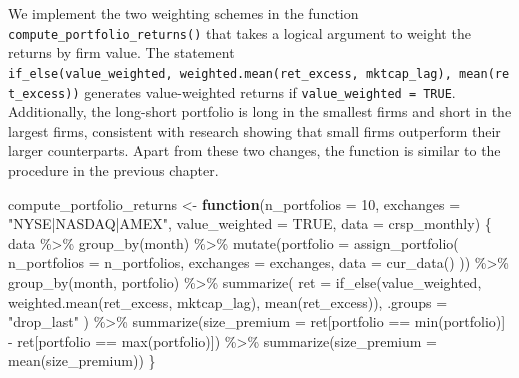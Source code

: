\documentclass[
]{krantz}
\newenvironment{Shaded}{\begin{snugshade}}{\end{snugshade}}
\newcommand{\AttributeTok}[1]{\textcolor[rgb]{0.61,0.61,0.61}{#1}}
\newcommand{\ConstantTok}[1]{\textcolor[rgb]{0,0,0}{#1}}
\newcommand{\ControlFlowTok}[1]{\textcolor[rgb]{0.27,0.27,0.27}{\textbf{#1}}}
\newcommand{\DecValTok}[1]{\textcolor[rgb]{0.06,0.06,0.06}{#1}}
\newcommand{\FunctionTok}[1]{\textcolor[rgb]{0,0,0}{#1}}
\newcommand{\NormalTok}[1]{#1}
\newcommand{\OtherTok}[1]{\textcolor[rgb]{0.37,0.37,0.37}{#1}}
\newcommand{\SpecialCharTok}[1]{\textcolor[rgb]{0,0,0}{#1}}
\newcommand{\StringTok}[1]{\textcolor[rgb]{0.5,0.5,0.5}{#1}}
\begin{document}
We implement the two weighting schemes in the function \texttt{compute\_portfolio\_returns()} that takes a logical argument to weight the returns by firm value. The statement \texttt{if\_else(value\_weighted,\ weighted.mean(ret\_excess,\ mktcap\_lag),\ mean(ret\_excess))} generates value-weighted returns if \texttt{value\_weighted\ =\ TRUE}. Additionally, the long-short portfolio is long in the smallest firms and short in the largest firms, consistent with research showing that small firms outperform their larger counterparts. Apart from these two changes, the function is similar to the procedure in the previous chapter.

\begin{Shaded}
\begin{Highlighting}[]
\NormalTok{compute\_portfolio\_returns }\OtherTok{\textless{}{-}} \ControlFlowTok{function}\NormalTok{(}\AttributeTok{n\_portfolios =} \DecValTok{10}\NormalTok{,}
                                      \AttributeTok{exchanges =} \StringTok{"NYSE|NASDAQ|AMEX"}\NormalTok{,}
                                      \AttributeTok{value\_weighted =} \ConstantTok{TRUE}\NormalTok{,}
                                      \AttributeTok{data =}\NormalTok{ crsp\_monthly) \{}
\NormalTok{  data }\SpecialCharTok{\%\textgreater{}\%}
    \FunctionTok{group\_by}\NormalTok{(month) }\SpecialCharTok{\%\textgreater{}\%}
    \FunctionTok{mutate}\NormalTok{(}\AttributeTok{portfolio =} \FunctionTok{assign\_portfolio}\NormalTok{(}
      \AttributeTok{n\_portfolios =}\NormalTok{ n\_portfolios,}
      \AttributeTok{exchanges =}\NormalTok{ exchanges,}
      \AttributeTok{data =} \FunctionTok{cur\_data}\NormalTok{()}
\NormalTok{    )) }\SpecialCharTok{\%\textgreater{}\%}
    \FunctionTok{group\_by}\NormalTok{(month, portfolio) }\SpecialCharTok{\%\textgreater{}\%}
    \FunctionTok{summarize}\NormalTok{(}
      \AttributeTok{ret =} \FunctionTok{if\_else}\NormalTok{(value\_weighted, }\FunctionTok{weighted.mean}\NormalTok{(ret\_excess, mktcap\_lag), }\FunctionTok{mean}\NormalTok{(ret\_excess)),}
      \AttributeTok{.groups =} \StringTok{"drop\_last"}
\NormalTok{    ) }\SpecialCharTok{\%\textgreater{}\%}
    \FunctionTok{summarize}\NormalTok{(}\AttributeTok{size\_premium =}\NormalTok{ ret[portfolio }\SpecialCharTok{==} \FunctionTok{min}\NormalTok{(portfolio)] }\SpecialCharTok{{-}}\NormalTok{ ret[portfolio }\SpecialCharTok{==} \FunctionTok{max}\NormalTok{(portfolio)]) }\SpecialCharTok{\%\textgreater{}\%}
    \FunctionTok{summarize}\NormalTok{(}\AttributeTok{size\_premium =} \FunctionTok{mean}\NormalTok{(size\_premium))}
\NormalTok{\}}
\end{Highlighting}
\end{Shaded}
\end{document}
